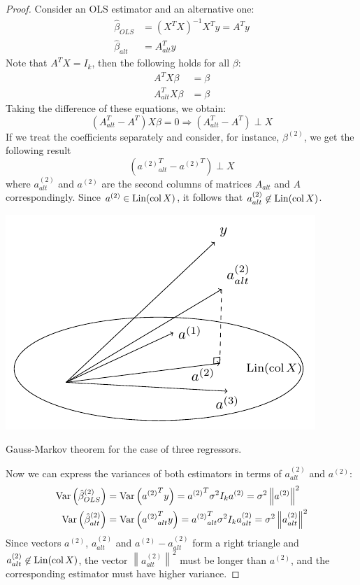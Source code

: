 \begin{proof}
Consider an OLS estimator and an alternative one:
\begin{align*}
\hat{\beta}_{OLS} &= (X^T X)^{-1} X^T y = A^T y \\
\hat{\beta}_{alt} &= A^T_{alt} y
\end{align*}
Note that $A^T X = I_{k}$, then the following holds for all $\beta$:
\begin{align*}
A^T X \beta &= \beta \\
A^T_{alt} X \beta &= \beta
\end{align*}
Taking the difference of these equations, we obtain:
\[
\left(A^T_{alt} - A^T\right) X \beta = 0 \Rightarrow \left(A^T_{alt} - A^T\right) \perp X
\]
If we treat the coefficients separately and consider, for instance, $\beta^{(2)}$,
we get the following result
\[
\left({a^{(2)}}^T_{alt} - {a^{(2)}}^T\right) \perp X
\]
where $a^{(2)}_{alt}$ and $a^{(2)}$ are the second columns of matrices
$A_{alt}$ and $A$ correspondingly.
Since $a^{(2)} \in \operatorname{Lin}(\operatorname{col} X)$, it follows that $a^{(2)}_{alt} \not \in \operatorname{Lin}(\operatorname{col} X)$.

\begin{marginfigure}[1\baselineskip]
\includegraphics[scale=0.7]{figures/02_gmt.pdf}
\label{fig:gmt}
\caption{Gauss-Markov theorem for the case of three regressors.}
\end{marginfigure}

Now we can express the variances of both estimators in terms of $a^{(2)}_{alt}$ and $a^{(2)}$:
\begin{align*}
\operatorname{Var}\left(\hat{\beta}^{(2)}_{OLS}\right) &= \operatorname{Var}\left({a^{(2)}}^T y\right) = {a^{(2)}}^T \sigma^2 I_{k} a^{(2)} = \sigma^2 \left\lVert a^{(2)} \right\rVert^2 \\
\operatorname{Var}\left(\hat{\beta}^{(2)}_{alt}\right) &= \operatorname{Var}\left({a^{(2)}}^T_{alt} y\right) =  {a^{(2)}}^T_{alt} \sigma^2 I_{k} a^{(2)}_{alt} = \sigma^2 \left\lVert a_{alt}^{(2)} \right\rVert^2
\end{align*}
Since vectors $a^{(2)}$, $a^{(2)}_{alt}$ and $a^{(2)} - a^{(2)}_{alt}$
form a right triangle and $a^{(2)}_{alt} \not \in \operatorname{Lin}(\operatorname{col} X)$,
the vector $\left\lVert a_{alt}^{(2)} \right\rVert^2$ must be longer than $a^{(2)}$,
and the corresponding estimator must have higher variance.

\end{proof}


